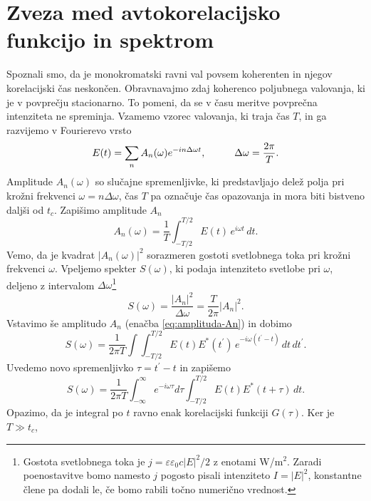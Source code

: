 \section{Zveza med avtokorelacijsko funkcijo in spektrom}

Spoznali smo, da je monokromatski ravni val povsem koherenten in njegov
korelacijski čas neskončen. Obravnavajmo zdaj koherenco poljubnega valovanja, ki
je v povprečju stacionarno. To pomeni, da se v času meritve povprečna intenziteta
ne spreminja. Vzamemo vzorec valovanja, ki traja čas $T$, in ga razvijemo 
v Fourierevo vrsto
\begin{equation}
E(t)=\sum_{n}A_{n}(\omega)e^{-in\Delta\omega t},\mbox{\hskip1cm}\Delta\omega=\frac{2\pi}{T}.
\end{equation}
Amplitude $A_{n}(\omega)$ so slučajne spremenljivke, ki predstavljajo delež polja pri 
krožni frekvenci $\omega=n\Delta\omega$, 
čas $T$ pa označuje čas opazovanja in mora biti bistveno daljši od $t_{c}$. 
Zapišimo amplitude $A_n$
\begin{equation}
A_{n}(\omega)=\frac{1}{T}\int_{-T/2}^{T/2}E(t)\, e^{i\omega t}\, dt.\label{eq:amplituda-An}
\end{equation}
 Vemo, da je kvadrat $|A_{n}(\omega)|^{2}$ sorazmeren gostoti 
svetlobnega toka pri krožni frekvenci $\omega$. Vpeljemo 
spekter $S(\omega)$, ki podaja intenziteto svetlobe pri $\omega$,
deljeno z intervalom $\Delta\omega$\footnote{Gostota 
svetlobnega toka 
je $j = \varepsilon \varepsilon_0 c |E|^2/2$
z enotami W/m$^2$. Zaradi poenostavitve bomo namesto $j$ pogosto pisali intenziteto 
$I = |E|^2$, konstantne člene pa dodali le, če bomo rabili točno numerično vrednost.} 
\begin{equation}
S(\omega)=\frac{|A_{n}|^{2}}{\Delta\omega}=\frac{T}{2\pi}|A_{n}|^{2}.
\end{equation}
Vstavimo še amplitudo $A_{n}$ (enačba \ref{eq:amplituda-An}) in dobimo 
\begin{equation}
S(\omega) =\frac{1}{2\pi T}\int\int_{-T/2}^{T/2}E(t)E^{*}(t^{\prime})\, 
e^{-i\omega(t^{\prime}-t)}\, dt\, dt^{\prime}.
\end{equation}
Uvedemo novo spremenljivko $\tau=t^{\prime}-t$ in zapišemo
\begin{equation}
S(\omega)=\frac{1}{2\pi T}\int_{-\infty}^{\infty}e^{-i\omega\tau}d\tau\int_{-T/2}^{T/2}E(t)E^{*}(t+\tau)\, dt.
\label{eq:spekter}
\end{equation}
Opazimo, da je integral po $t$ ravno enak korelacijski funkciji $G(\tau)$. Ker je $T\gg t_{c}$,
